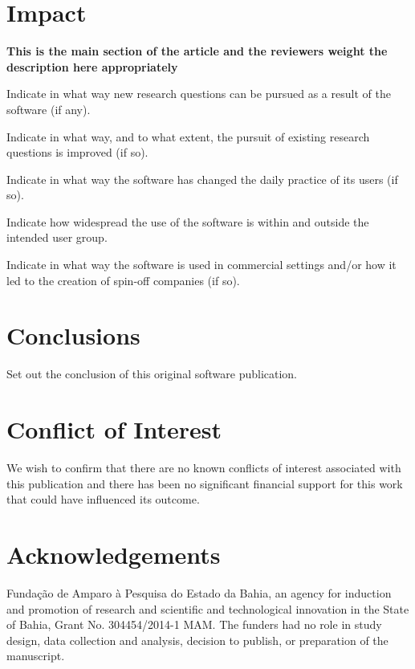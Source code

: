 \documentclass[preprint,12pt, a4paper]{elsarticle}
\begin{document}
\section{Impact}
\label{impact}

\textbf{This is the main section of the article and the reviewers weight the description here appropriately}

Indicate in what way new research questions can be pursued as a result of the software (if any).

Indicate in what way, and to what extent, the pursuit of existing research questions is improved (if so).

Indicate in what way the software has changed the daily practice of its users (if so).

Indicate how widespread the use of the software is within and outside the intended user group.

Indicate in what way the software is used in commercial settings and/or how it led to the creation of spin-off companies (if so).

\section{Conclusions}
\label{conclusions}

Set out the conclusion of this original software publication.

\section{Conflict of Interest}
We wish to confirm that there are no known conflicts of interest associated with this publication and there has been no significant financial support for this work that could have influenced its outcome.


\section*{Acknowledgements}
\label{acknowledgements}

Funda\c{c}\~{a}o de Amparo \`{a} Pesquisa do Estado da Bahia, 
an agency for induction and promotion of research and scientific and 
technological innovation in the State of Bahia, 
Grant No. 304454/2014-1 MAM. 
The funders had no role in study design, data collection and analysis, 
decision to publish, or preparation of the manuscript.
\end{document}
